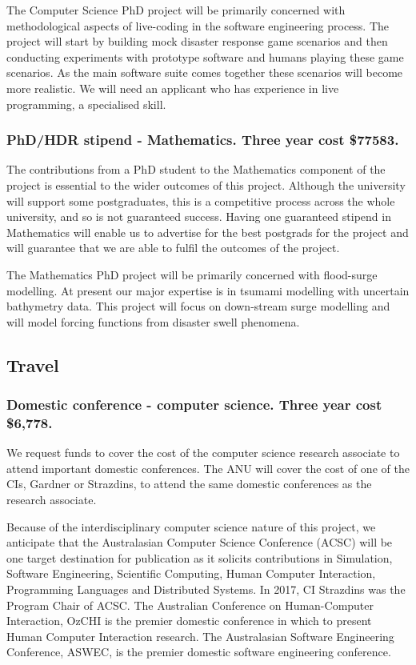 \documentclass[a4paper,twoside,12pt,compact]{article}
\begin{document}
The Computer Science PhD project will be primarily concerned with methodological aspects of live-coding in the software engineering process. The project will start by building mock disaster response game scenarios and then conducting experiments with prototype software and humans playing these game scenarios. As the main software suite comes together these scenarios will become more realistic. We will need an applicant who has experience in live programming, a specialised skill. 

\subsubsection*{PhD/HDR stipend - Mathematics. Three year cost \$77583.}

The contributions from a PhD student to the Mathematics component of the project is essential to the wider outcomes of this project.
Although the university will support some postgraduates, this is a competitive
process across the whole university, and so is not guaranteed success. Having one guaranteed stipend in Mathematics will enable us to advertise for the best postgrads for the project and will guarantee that we are able to fulfil the outcomes of the project. 

The Mathematics PhD project will be primarily concerned with flood-surge modelling. At present our major expertise is in tsumami modelling with uncertain bathymetry data. This project will focus on down-stream surge modelling and will model forcing functions from disaster swell phenomena. 

\subsection*{Travel}

\subsubsection*{Domestic conference - computer science. Three year cost \$6,778.}

We request funds to cover the cost of the computer science research associate to attend important domestic conferences.  The ANU will cover the cost of one of the CIs, Gardner or Strazdins, to attend the same domestic conferences as the research associate. 

Because of the interdisciplinary computer science nature of this project, we anticipate that the Australasian Computer Science Conference (ACSC) will be one target destination for publication as it solicits contributions in Simulation, Software Engineering, Scientific Computing, Human Computer Interaction, Programming Languages and Distributed Systems. In 2017, CI Strazdins was the Program Chair of ACSC. 
The Australian Conference on Human-Computer Interaction, OzCHI is the premier domestic conference in which to present Human Computer Interaction research. The Australasian Software Engineering Conference, ASWEC, is the premier domestic software engineering conference. 
\end{document}
